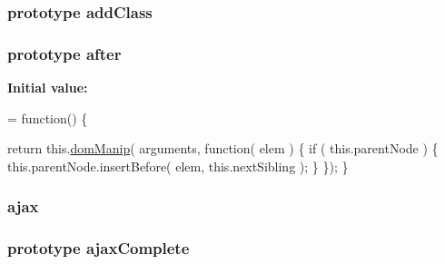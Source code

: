 \hypertarget{jquery-1_810_82-vsdoc_8js_ac98f6924e42def59f1eb8d3ea1892a8e}{
\subsubsection[{add\-Class}]{ {\bf prototype} add\-Class}}\label{jquery-1_810_82-vsdoc_8js_ac98f6924e42def59f1eb8d3ea1892a8e}
\hypertarget{jquery-1_810_82-vsdoc_8js_a80413815f48b2c1f574e33fd8a7c3896}{
\subsubsection[{after}]{ {\bf prototype} after}}\label{jquery-1_810_82-vsdoc_8js_a80413815f48b2c1f574e33fd8a7c3896}
{\bfseries Initial value\-:}
\begin{DoxyCode}
= \textcolor{keyword}{function}() \{


        \textcolor{keywordflow}{return} this.\hyperlink{jquery-1_810_82-vsdoc_8js_a00a63bd312ef048290dc1755ccb8bae4}{domManip}( arguments, \textcolor{keyword}{function}( elem ) \{
            \textcolor{keywordflow}{if} ( this.parentNode ) \{
                this.parentNode.insertBefore( elem, this.nextSibling );
            \}
        \});
    \}
\end{DoxyCode}
\hypertarget{jquery-1_810_82-vsdoc_8js_a3c9e2ac71a76356869090140308936dc}{
\subsubsection[{ajax}]{ ajax}}\label{jquery-1_810_82-vsdoc_8js_a3c9e2ac71a76356869090140308936dc}
\hypertarget{jquery-1_810_82-vsdoc_8js_ab4777151692b2525369c42a5f056725e}{
\subsubsection[{ajax\-Complete}]{ {\bf prototype} ajax\-Complete}}\label{jquery-1_810_82-vsdoc_8js_ab4777151692b2525369c42a5f056725e}

